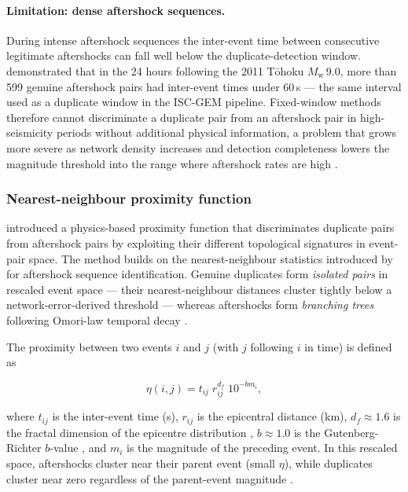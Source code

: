 \documentclass[12pt]{article}
\begin{document}
\paragraph{Limitation: dense aftershock sequences.}
During intense aftershock sequences the inter-event time between consecutive
legitimate aftershocks can fall well below the duplicate-detection window.
\citet{Tanaka2022} demonstrated that in the 24 hours following the 2011 Tōhoku
$M_\mathrm{w}$\,9.0, more than 599 genuine aftershock pairs had inter-event
times under 60\,s — the same interval used as a duplicate window in the ISC-GEM
pipeline.  Fixed-window methods therefore cannot discriminate a duplicate pair
from an aftershock pair in high-seismicity periods without additional physical
information, a problem that grows more severe as network density increases and
detection completeness lowers the magnitude threshold into the range where
aftershock rates are high \citep{Hainzl2016}.

\subsubsection{Nearest-neighbour proximity function}
\label{sec:nn}

\citet{Tanaka2022} introduced a physics-based proximity function that
discriminates duplicate pairs from aftershock pairs by exploiting their
different topological signatures in event-pair space.  The method builds on the
nearest-neighbour statistics introduced by \citet{Zaliapin2008} for aftershock
sequence identification.  Genuine duplicates form \emph{isolated pairs} in
rescaled event space — their nearest-neighbour distances cluster tightly below
a network-error-derived threshold — whereas aftershocks form \emph{branching
trees} following Omori-law temporal decay \citep{Omori1894, Utsu1961}.

The proximity between two events $i$ and $j$ (with $j$ following $i$ in time)
is defined as

\begin{equation}
  \eta(i,j) = t_{ij}\; r_{ij}^{d_f}\; 10^{-b m_i},
  \label{eq:proximity}
\end{equation}

where $t_{ij}$ is the inter-event time (s), $r_{ij}$ is the epicentral distance
(km), $d_f \approx 1.6$ is the fractal dimension of the epicentre distribution
\citep{Kagan1991}, $b \approx 1.0$ is the Gutenberg-Richter $b$-value
\citep{Aki1965}, and $m_i$ is the magnitude of the preceding event.  In this
rescaled space, aftershocks cluster near their parent event (small $\eta$),
while duplicates cluster near zero regardless of the parent-event magnitude
\citep{Zaliapin2008, Tanaka2022}.
\end{document}
